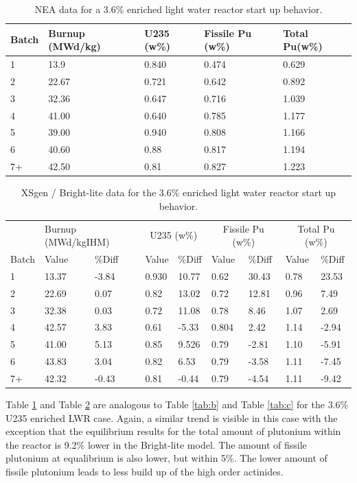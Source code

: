 \documentclass{article}
\begin{document}
\begin{table}[!htb]
\centering
\caption{NEA data for a 3.6\% enriched light water reactor start up behavior.}
\label{tab:d}
\begin{tabular}{lllll}
Batch & Burnup (MWd/kg) & U235 (w\%) & Fissile Pu (w\%) & Total Pu(w\%) \\
\hline
1 & 13.9 & 0.840 & 0.474 & 0.629 \\
2 & 22.67 & 0.721 & 0.642 & 0.892 \\
3 & 32.36 & 0.647 & 0.716 & 1.039 \\
4 & 41.00 & 0.640 & 0.785 & 1.177 \\
5 & 39.00 & 0.940 & 0.808 & 1.166 \\
6 & 40.60 & 0.88 & 0.817 & 1.194 \\
7+ & 42.50 & 0.81 & 0.827 & 1.223
\end{tabular}
\end{table}

\begin{table}[!htb]
\centering
\caption{XSgen / Bright-lite data for the 3.6\% enriched light water reactor start up behavior.}
\label{tab:e}
\begin{tabular}{l | ll | ll | ll | ll}
 & \multicolumn{2}{p{1cm}}{Burnup (MWd/kgIHM)} & \multicolumn{2}{c}{U235 (w\%)} & \multicolumn{2}{c}{Fissile Pu (w\%)} & \multicolumn{2}{c}{Total Pu (w\%)} \\
Batch & Value & \%Diff & Value & \%Diff & Value & \%Diff & Value & \%Diff \\
\hline
1 & 13.37 & -3.84 & 0.930 & 10.77 & 0.62 & 30.43 & 0.78 & 23.53 \\
2 & 22.69 & 0.07 & 0.82 & 13.02 & 0.72 & 12.81 & 0.96 & 7.49 \\
3 & 32.38 & 0.03 & 0.72 & 11.08 & 0.78 & 8.46 & 1.07 & 2.69 \\
4 & 42.57 & 3.83 & 0.61 & -5.33 & 0.804 & 2.42 & 1.14 & -2.94 \\
5 & 41.00 & 5.13 & 0.85 & 9.526 & 0.79 & -2.81 & 1.10 & -5.91 \\
6 & 43.83 & 3.04 & 0.82 & 6.53 & 0.79 & -3.58 & 1.11 & -7.45 \\
7+ & 42.32 & -0.43 & 0.81 & -0.44 & 0.79 & -4.54 & 1.11 & -9.42
\end{tabular}
\end{table}

Table \ref{tab:d} and Table \ref{tab:e} are analogous to Table \ref{tab:b} and Table \ref{tab:c}
for the 3.6\% U235 enriched LWR case. Again, a similar trend is visible in this case with the
exception that the equilibrium results for the total amount of plutonium within the
reactor is 9.2\% lower in the Bright-lite model. The amount of fissile plutonium at equalibrium is also lower,
but within 5\%. The lower amount of fissile plutonium leads
to less build up of the high order actinides.
\end{document}
